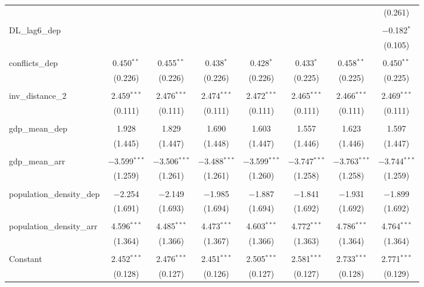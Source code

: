 \begin{table}[!htbp]
\begin{tabular}{@{\extracolsep{5pt}}lccccccc}
  &  &  &  &  &  &  & (0.261) \\ 
  & & & & & & & \\ 
 DL\_lag6\_dep &  &  &  &  &  &  & $-$0.182$^{*}$ \\ 
  &  &  &  &  &  &  & (0.105) \\ 
  & & & & & & & \\ 
 conflicts\_dep & 0.450$^{**}$ & 0.455$^{**}$ & 0.438$^{*}$ & 0.428$^{*}$ & 0.433$^{*}$ & 0.458$^{**}$ & 0.450$^{**}$ \\ 
  & (0.226) & (0.226) & (0.226) & (0.226) & (0.225) & (0.225) & (0.225) \\ 
  & & & & & & & \\ 
 inv\_distance\_2 & 2.459$^{***}$ & 2.476$^{***}$ & 2.474$^{***}$ & 2.472$^{***}$ & 2.465$^{***}$ & 2.466$^{***}$ & 2.469$^{***}$ \\ 
  & (0.111) & (0.111) & (0.111) & (0.111) & (0.111) & (0.111) & (0.111) \\ 
  & & & & & & & \\ 
 gdp\_mean\_dep & 1.928 & 1.829 & 1.690 & 1.603 & 1.557 & 1.623 & 1.597 \\ 
  & (1.445) & (1.447) & (1.448) & (1.447) & (1.446) & (1.446) & (1.447) \\ 
  & & & & & & & \\ 
 gdp\_mean\_arr & $-$3.599$^{***}$ & $-$3.506$^{***}$ & $-$3.488$^{***}$ & $-$3.599$^{***}$ & $-$3.747$^{***}$ & $-$3.763$^{***}$ & $-$3.744$^{***}$ \\ 
  & (1.259) & (1.261) & (1.261) & (1.260) & (1.258) & (1.258) & (1.259) \\ 
  & & & & & & & \\ 
 population\_density\_dep & $-$2.254 & $-$2.149 & $-$1.985 & $-$1.887 & $-$1.841 & $-$1.931 & $-$1.899 \\ 
  & (1.691) & (1.693) & (1.694) & (1.694) & (1.692) & (1.692) & (1.692) \\ 
  & & & & & & & \\ 
 population\_density\_arr & 4.596$^{***}$ & 4.485$^{***}$ & 4.473$^{***}$ & 4.603$^{***}$ & 4.772$^{***}$ & 4.786$^{***}$ & 4.764$^{***}$ \\ 
  & (1.364) & (1.366) & (1.367) & (1.366) & (1.363) & (1.364) & (1.364) \\ 
  & & & & & & & \\ 
 Constant & 2.452$^{***}$ & 2.476$^{***}$ & 2.451$^{***}$ & 2.505$^{***}$ & 2.581$^{***}$ & 2.733$^{***}$ & 2.771$^{***}$ \\ 
  & (0.128) & (0.127) & (0.126) & (0.127) & (0.127) & (0.128) & (0.129) \\ 

\end{tabular}
\end{table}
